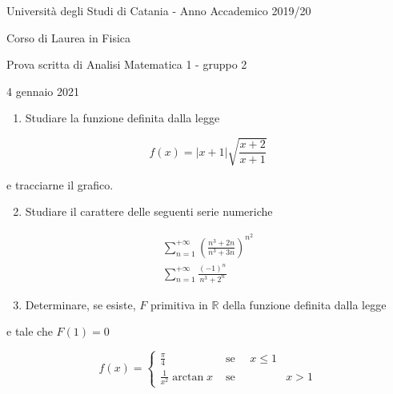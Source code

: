\documentclass[10pt]{article}
\begin{document}
Università degli Studi di Catania - Anno Accademico 2019/20

Corso di Laurea in Fisica

Prova scritta di Analisi Matematica 1 - gruppo 2

4 gennaio 2021

\begin{enumerate}
  \item Studiare la funzione definita dalla legge
\end{enumerate}

\[
f(x)=|x+1| \sqrt{\frac{x+2}{x+1}}
\]

e tracciarne il grafico.

\begin{enumerate}
  \setcounter{enumi}{1}
  \item Studiare il carattere delle seguenti serie numeriche
\end{enumerate}

\[
\begin{gathered}
\sum_{n=1}^{+\infty}\left(\frac{n^{3}+2 n}{n^{3}+3 n}\right)^{n^{2}} \\
\sum_{n=1}^{+\infty} \frac{(-1)^{n}}{n^{3}+2^{n}}
\end{gathered}
\]

\begin{enumerate}
  \setcounter{enumi}{2}
  \item Determinare, se esiste, \(F\) primitiva in \(\mathbb{R}\) della funzione definita dalla legge
\end{enumerate}

e tale che \(F(1)=0\)

\[
f(x)=\left\{\begin{array}{lll}
\frac{\pi}{4} & \text { se } \quad x \leq 1 \\
\frac{1}{x^{2}} \arctan x & \text { se } & x>1
\end{array}\right.
\]
\end{document}
